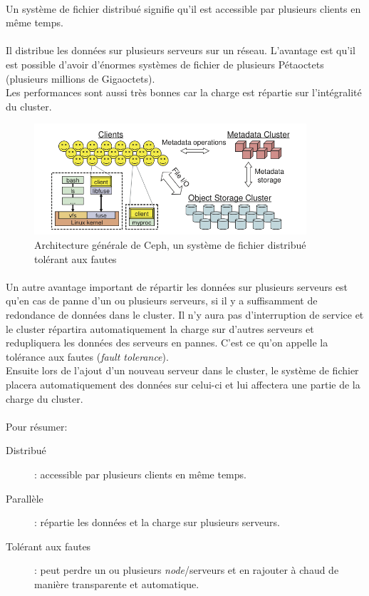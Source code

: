 \paragraph*{}
Un système de fichier distribué signifie qu'il est accessible par plusieurs clients en même temps.

\paragraph*{}
Il distribue les données sur plusieurs serveurs sur un réseau. L'avantage est qu'il est possible d'avoir d'énormes systèmes de fichier de plusieurs
Pétaoctets (plusieurs millions de Gigaoctets).\\
Les performances sont aussi très bonnes car la charge est répartie sur l'intégralité du cluster.

\begin{figure}[H]
\centering
\includegraphics[width=0.9\textwidth]{resource/img/ceph-architecture}
\caption{Architecture générale de Ceph, un système de fichier distribué tolérant aux fautes}
\label{archionescalein}
\end{figure}

\paragraph*{}
Un autre avantage important de répartir les données sur plusieurs serveurs est qu'en cas de panne d'un ou plusieurs serveurs, si il y a suffisamment de redondance
de données dans le cluster. Il n'y aura pas d'interruption de service et le cluster répartira automatiquement la charge sur d'autres serveurs et redupliquera les données
des serveurs en pannes. C'est ce qu'on appelle la tolérance aux fautes (\emph{fault tolerance}).\\
Ensuite lors de l'ajout d'un nouveau serveur dans le cluster, le système de fichier placera automatiquement des données sur celui-ci et lui affectera une
partie de la charge du cluster.

\paragraph*{}
Pour résumer:
\begin{description}
	\item[Distribué] : accessible par plusieurs clients en même temps.
	\item[Parallèle] : répartie les données et la charge sur plusieurs serveurs.
	\item[Tolérant aux fautes]: peut perdre un ou plusieurs \emph{node}/serveurs et en rajouter à chaud de manière transparente et automatique.
\end{description}

